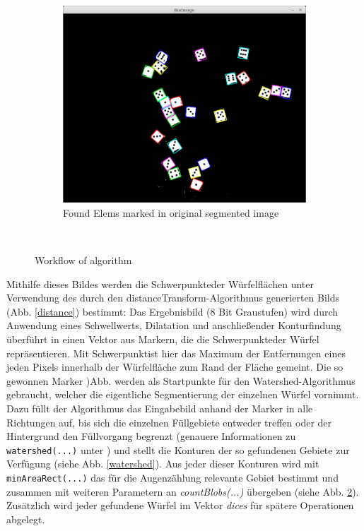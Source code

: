 \documentclass{../Vorlage/sebDenCls}
\begin{document}
\begin{figure}[htp]
\begin{subfigure}{\textwidth}
	\centering
	\includegraphics[width=.7\textwidth]{blobAreas} 
	\caption{Found Elems marked in original segmented image\label{result}}
\end{subfigure}\\
  \caption{Workflow of algorithm}
\end{figure}


Mithilfe dieses Bildes werden die \glqq Schwerpunkte\grqq  der Würfelflächen unter Verwendung des durch den distanceTransform-Algorithmus generierten Bilds (Abb. \ref{distance}) bestimmt: Das Ergebnisbild (8 Bit Graustufen) wird durch Anwendung eines Schwellwerts, Dilatation und anschließender Konturfindung überführt in einen Vektor aus Markern, die die \glqq Schwerpunkte\grqq  der Würfel repräsentieren. Mit \glqq Schwerpunkt\grqq  ist hier das Maximum der Entfernungen eines jeden Pixels innerhalb der Würfelfläche zum Rand der Fläche gemeint. 
Die so gewonnen Marker )Abb.  werden als Startpunkte für den Watershed-Algorithmus gebraucht, welcher die eigentliche Segmentierung der einzelnen Würfel vornimmt. Dazu füllt der Algorithmus das Eingabebild anhand der Marker in alle Richtungen auf, bis sich die einzelnen Füllgebiete entweder treffen oder der Hintergrund den Füllvorgang begrenzt (genauere Informationen zu \texttt{watershed(...)} unter \cite{opCV15}) und stellt die Konturen der so gefundenen Gebiete zur Verfügung (siehe Abb. \ref{watershed}). 
Aus jeder dieser Konturen wird mit\texttt{ minAreaRect(...)} das für die Augenzählung relevante Gebiet bestimmt und zusammen mit weiteren Parametern an \emph{countBlobs(...)} übergeben (siehe Abb. \ref{result}). Zusätzlich wird jeder gefundene Würfel im Vektor \emph{dices} für spätere Operationen abgelegt.
\end{document}
